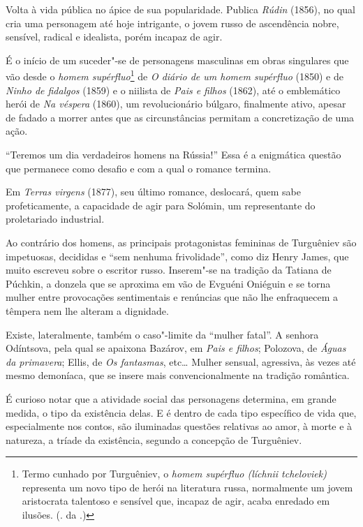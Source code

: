 Volta à vida pública no ápice de sua popularidade. Publica \emph{Rúdin} (1856), no qual cria uma personagem até hoje
intrigante, o jovem russo de ascendência nobre, sensível, radical e
idealista, porém incapaz de agir.

É o início de um suceder"-se de personagens masculinas em obras
singulares que vão desde o \emph{homem supérfluo}\footnote{Termo cunhado por Turguêniev, o \emph{homem supérfluo
(líchnii tcheloviek)} representa um novo tipo de herói na
literatura russa, normalmente um jovem aristocrata talentoso e
sensível que, incapaz de agir, acaba enredado em ilusões.
(. da .)} de \emph{O diário de um
homem supérfluo} (1850) e de \emph{Ninho de fidalgos} (1859) e o niilista de
\emph{Pais e filhos} (1862), até o emblemático herói de \emph{Na véspera}
(1860), um revolucionário búlgaro, finalmente ativo, apesar de fadado a
morrer antes que as circunstâncias permitam a concretização de uma ação.

``Teremos um dia verdadeiros homens na Rússia!'' Essa é a enigmática
questão que permanece como desafio e com a qual o romance termina.

Em \emph{Terras virgens} (1877), seu último romance, deslocará, quem
sabe profeticamente, a capacidade de agir para Solómin, um representante
do proletariado industrial.

Ao contrário dos homens, as principais protagonistas femininas de
Turguêniev são impetuosas, decididas e ``sem nenhuma frivolidade'', como
diz Henry James, que muito escreveu sobre o escritor russo. Inserem"-se
na tradição da Tatiana de Púchkin, a donzela que se aproxima em vão de Evguéni Oniéguin e se
torna mulher entre provocações sentimentais e renúncias que não lhe
enfraquecem a têmpera nem lhe alteram a dignidade.

Existe, lateralmente, também o caso"-limite da ``mulher fatal''. A
senhora Odíntsova, pela qual se apaixona Bazárov, em \emph{Pais e filhos}; Polozova, de
\emph{Águas da primavera}; Ellis, de \emph{Os fantasmas}, etc\ldots{} Mulher
sensual, agressiva, às vezes até mesmo demoníaca, que se insere mais
convencionalmente na tradição romântica.

É curioso notar que a atividade social das personagens determina, em grande
medida, o tipo da existência delas. E é dentro de cada tipo
específico de vida que, especialmente nos contos, são iluminadas
questões relativas ao amor, à morte e à natureza, a tríade da
existência, segundo a concepção de Turguêniev.

